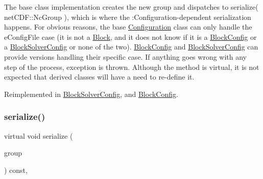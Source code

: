 The base class implementation creates the new group and dispatches to serialize( net\+C\+D\+F\+::\+Nc\+Group ), which is where the \+:Configuration-\/dependent serialization happens. For obvious reasons, the base \mbox{\hyperlink{class_s_m_spp__di__unipi__it_1_1_configuration}{Configuration}} class can only handle the e\+Config\+File case (it is not a \mbox{\hyperlink{class_s_m_spp__di__unipi__it_1_1_block}{Block}}, and it does not know if it is a \mbox{\hyperlink{class_s_m_spp__di__unipi__it_1_1_block_config}{Block\+Config}} or a \mbox{\hyperlink{class_s_m_spp__di__unipi__it_1_1_block_solver_config}{Block\+Solver\+Config}} or none of the two). \mbox{\hyperlink{class_s_m_spp__di__unipi__it_1_1_block_config}{Block\+Config}} and \mbox{\hyperlink{class_s_m_spp__di__unipi__it_1_1_block_solver_config}{Block\+Solver\+Config}} can provide versions handling their specific case. If anything goes wrong with any step of the process, exception is thrown. Although the method is virtual, it is not expected that derived classes will have a need to re-\/define it. 

Reimplemented in \mbox{\hyperlink{class_s_m_spp__di__unipi__it_1_1_block_solver_config_a978c6b5919ce07663f3c325a99013bac}{Block\+Solver\+Config}}, and \mbox{\hyperlink{class_s_m_spp__di__unipi__it_1_1_block_config_a978c6b5919ce07663f3c325a99013bac}{Block\+Config}}.

\mbox{\label{class_s_m_spp__di__unipi__it_1_1_configuration_a59f3f59d72c56028f06c555bdcd36caf}} 
\subsubsection{\texorpdfstring{serialize()}{serialize()}\hspace{0.1cm}{\footnotesize\ttfamily [3/3]}}
{\footnotesize\ttfamily virtual void serialize (\begin{DoxyParamCaption}\item[{net\+C\+D\+F\+::\+Nc\+Group \&\&}]{group }\end{DoxyParamCaption}) const\hspace{0.3cm}{\ttfamily [inline]}, {\ttfamily [virtual]}}



